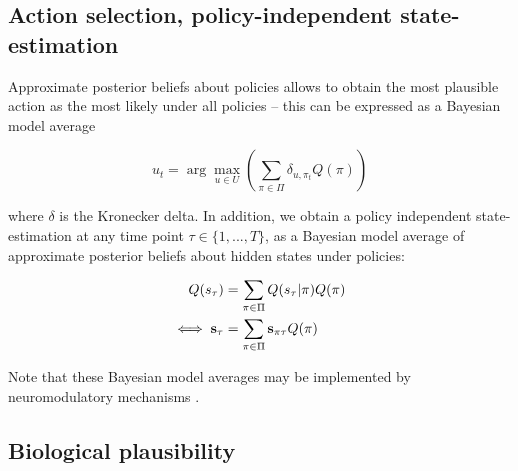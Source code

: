 \documentclass[review,12pt,authoryear]{elsarticle}
\begin{document}
\subsection{Action selection, policy-independent state-estimation}

Approximate posterior beliefs about policies allows to obtain the most plausible action as the most likely under all policies -- this can be expressed as a Bayesian model average

\begin{equation}
\label{eq: action selection}
    u_t = \arg \max_{u \in U } \left (\sum_{\pi \in \Pi} \delta_{u, \pi_t} Q(\pi)\right)
\end{equation}

where $\delta$ is the Kronecker delta. In addition, we obtain a policy independent state-estimation at any time point $\tau \in \{1,...,T\}$, as a Bayesian model average of approximate posterior beliefs about hidden states under policies:

\begin{equation}
\label{eq: policy indep}
    \begin{split}
        Q(s_\tau) &= \sum_{\pi \in \Pi} Q(s_\tau |\pi)Q(\pi)\\
        \iff \bold s_\tau &= \sum_{\pi \in \Pi} \bold s_{\pi\tau} Q(\pi)
    \end{split}
\end{equation}

Note that these Bayesian model averages may be implemented by neuromodulatory mechanisms \citep{fitzgeraldModelAveragingOptimal2014}.

\subsection{Biological plausibility}
\end{document}
